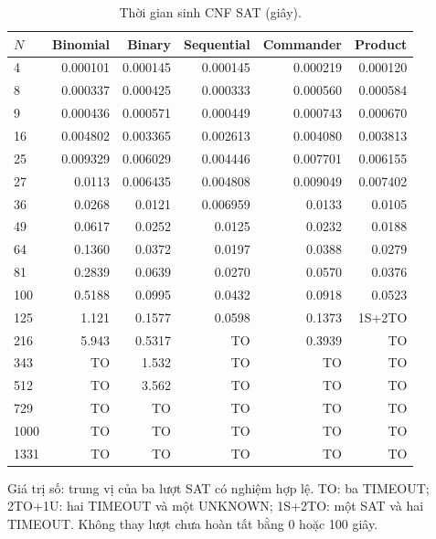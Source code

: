 \begin{table}[pos=H]
\centering
\small
\caption{Thời gian sinh CNF SAT (giây).}
\label{tab:sat_build}
\setlength{\tabcolsep}{4pt}
\begin{tabular}{@{}lrrrrr@{}}
\toprule
$N$ & Binomial & Binary & Sequential & Commander & Product \\
\midrule
4 & 0.000101 & 0.000145 & 0.000145 & 0.000219 & 0.000120 \\
8 & 0.000337 & 0.000425 & 0.000333 & 0.000560 & 0.000584 \\
9 & 0.000436 & 0.000571 & 0.000449 & 0.000743 & 0.000670 \\
16 & 0.004802 & 0.003365 & 0.002613 & 0.004080 & 0.003813 \\
25 & 0.009329 & 0.006029 & 0.004446 & 0.007701 & 0.006155 \\
27 & 0.0113 & 0.006435 & 0.004808 & 0.009049 & 0.007402 \\
36 & 0.0268 & 0.0121 & 0.006959 & 0.0133 & 0.0105 \\
49 & 0.0617 & 0.0252 & 0.0125 & 0.0232 & 0.0188 \\
64 & 0.1360 & 0.0372 & 0.0197 & 0.0388 & 0.0279 \\
81 & 0.2839 & 0.0639 & 0.0270 & 0.0570 & 0.0376 \\
100 & 0.5188 & 0.0995 & 0.0432 & 0.0918 & 0.0523 \\
125 & 1.121 & 0.1577 & 0.0598 & 0.1373 & 1S+2TO \\
216 & 5.943 & 0.5317 & TO & 0.3939 & TO \\
343 & TO & 1.532 & TO & TO & TO \\
512 & TO & 3.562 & TO & TO & TO \\
729 & TO & TO & TO & TO & TO \\
1000 & TO & TO & TO & TO & TO \\
1331 & TO & TO & TO & TO & TO \\
\bottomrule
\end{tabular}
\par\smallskip\begin{minipage}{\linewidth}\footnotesize Giá trị số: trung vị của ba lượt SAT có nghiệm hợp lệ. TO: ba TIMEOUT; 2TO+1U: hai TIMEOUT và một UNKNOWN; 1S+2TO: một SAT và hai TIMEOUT. Không thay lượt chưa hoàn tất bằng 0 hoặc 100 giây.\end{minipage}
\end{table}
